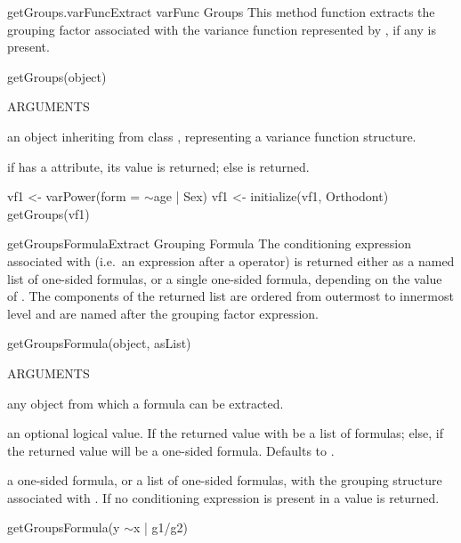 \documentclass[pdftex]{article} \usepackage{url,graphicx}
\renewcommand{\Twiddle}{\mbox{\(\sim\)}}
\begin{document}
\begin{Helpfile}{getGroups.varFunc}{Extract varFunc Groups}
This method function extracts the grouping factor associated with the
variance function represented by , if any is present.
\begin{Example}
getGroups(object)
\end{Example}
\begin{Argument}{ARGUMENTS}
\item[\Co{object:}]
an object inheriting from class ,
representing a variance function structure.
\end{Argument}
if  has a  attribute, its value is
returned; else  is returned.
\need 15pt
\vspace{-16pt} 
\begin{Example}
vf1 <- varPower(form = \Twiddle age | Sex)
vf1 <- initialize(vf1, Orthodont)
getGroups(vf1)
\end{Example}
\end{Helpfile}
\begin{Helpfile}{getGroupsFormula}{Extract Grouping Formula}
The conditioning expression associated with 
(i.e.\ an expression after a \Co{|} operator) is returned either as
a named list of one-sided formulas, or a single one-sided formula,
depending  on the value of . The components of the
returned list are ordered from outermost to innermost level and are
named after the grouping factor expression.
\begin{Example}
getGroupsFormula(object, asList)
\end{Example}
\begin{Argument}{ARGUMENTS}
\item[\Co{object:}]
any object from which a formula can be extracted.
\item[\Co{asList:}]
an optional logical value. If  the returned
value with be a list of formulas; else, if  the returned
value will be a one-sided formula. Defaults to .
\end{Argument}
a one-sided formula, or a list of one-sided formulas, with the
grouping structure associated with . If no
conditioning expression is present in  a
 value is returned.
\need 15pt
\vspace{-16pt} 
\begin{Example}
getGroupsFormula(y \Twiddle x | g1/g2)
\end{Example}
\end{Helpfile}
\end{document}

